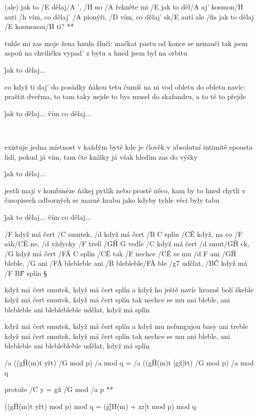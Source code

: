 \R  (ale) jak to /E dělaj/A ', /H no /A řekněte mi
    /E jak to děl/A aj' kosmon/H auti
    /h vím, co dělaj' /A pionýři, /D vím, co dělaj' sk/E auti
    ale /fis jak to dělaj /E kosmonau/H ti? **

tuhle mi zas moje žena hnula žlučí:
mačkat pastu od konce se nenaučí
tak jsem aspoň na chviličku vypad' z bytu
a hned jsem byl na orbitu

\r jak to dělaj...

co když ti daj' do posádky ňákou tetu
čumíš na ni vod obletu do obletu
navíc: praštit dveřma, to tam taky nejde
to bys musel do skafandru, a to tě to přejde

\r jak to dělaj...
\r vím co dělaj...

\ \songgg

existuje jedna místnost v každým bytě
kde je člověk v absolutní intimitě
spousta lidí, pokud já vím, tam čte knížky
já však hledím zas do výšky

\r jak to dělaj...

jestli mají v kombinéze ňákej pytlík
nebo prostě něco, kam by to hned chytli
v časopisech odborných se marně hrabu
jako kdyby tyhle věci byly tabu

\r jak to dělaj...
\r vím co dělaj...




/F když má čert /C smutek, /d když má čert /{B C} splín
/C\^E když, na co /F sáh/C\^E ne, /d vždycky /F trefí /{G\^H G} vedle
/C když má čert /d smut/G\^H ek, /G když má čert /{F\^A C} splín
/C\^E tak /F nechce /C\^E se mu /{d F} ani   /G\^H bleble, /G ani /F\^A blebleble
ani /B blebleble/F\^A ble   /g7 udělat, /B\^C když má /{F B\^F} splín \S

když má čert smutek, když má čert splín
a když ho ještě navíc hrozně bolí škeble
když má čert smutek, když má čert splín
tak nechce se mu ani bleble, ani blebleble
ani bleblebleble udělat, když má splín \s

když má čert smutek, když má čert splín
a když mu nefungujou basy ani treble
když má čert smutek, když má čert splín
tak nechce se mu ani bleble, ani blebleble
ani bleblebleble udělat, když má splín



/a ((g\^{H(m)t} y\^{rt}) /G mod p) /a mod q = 
/a ((g\^{H(m)t} [g\^x]\^{rt}) /G mod p) /a mod q

\R protože /C y = g\^x /G mod /a p **

((g\^{H(m)t} y\^{rt}) mod p) mod q = 
(g\^{[H(m) + xr]t} mod p) mod q

